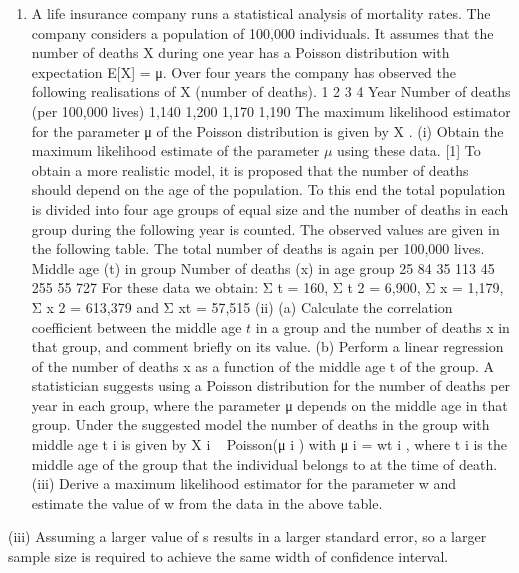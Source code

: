 \documentclass[a4paper,12pt]{article}
\begin{document}
\begin{enumerate}
\item A life insurance company runs a statistical analysis of mortality rates. The company considers a population of 100,000 individuals. It assumes that the number of deaths X during one year has a Poisson distribution with expectation E[X] = μ. Over four years
the company has observed the following realisations of X (number of deaths).
1
2
3
4
Year
Number of deaths (per 100,000 lives) 1,140 1,200 1,170 1,190
The maximum likelihood estimator for the parameter μ of the Poisson distribution is
given by X .
(i)
Obtain the maximum likelihood estimate of the parameter $\mu$ using these data.
[1]
To obtain a more realistic model, it is proposed that the number of deaths should
depend on the age of the population. To this end the total population is divided into
four age groups of equal size and the number of deaths in each group during the
following year is counted. The observed values are given in the following table. The
total number of deaths is again per 100,000 lives.
Middle age (t) in group
Number of deaths (x) in age group
25
84
35
113
45
255
55
727
For these data we obtain: Σ t = 160, Σ t 2 = 6,900, Σ x = 1,179, Σ x 2 = 613,379 and
Σ xt = 57,515
(ii)
(a) Calculate the correlation coefficient between the middle age $t$ in a group and the number of deaths x in that group, and comment briefly on its value.
(b) Perform a linear regression of the number of deaths x as a function of the middle age t of the group.
A statistician suggests using a Poisson distribution for the number of deaths per year in each group, where the parameter μ depends on the middle age in that group. Under the suggested model the number of deaths in the group with middle age t i is given by X i ~ Poisson(μ i ) with μ i = wt i , where t i is the middle age of the group that the individual belongs to at the time of death.
(iii)
Derive a maximum likelihood estimator for the parameter w and estimate the value of w from the data in the above table.
\end{enumerate}

(iii) Assuming a larger value of s results in a larger standard error, so a larger sample size is required to achieve the same width of confidence interval.
\end{document}

